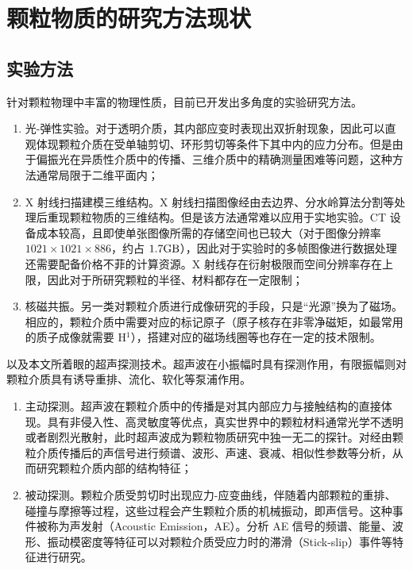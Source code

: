 \section{颗粒物质的研究方法现状}


\subsection{实验方法}

针对颗粒物理中丰富的物理性质，目前已开发出多角度的实验研究方法。

\begin{enumerate}
  \item 光-弹性实验\cite{photoelasticimetry}。对于透明介质，其内部应变时表现出双折射现象，因此可以直观体现颗粒介质在受单轴剪切、环形剪切等条件下其中内的应力分布。但是由于偏振光在异质性介质中的传播、三维介质中的精确测量困难等问题\cite{Non-Destructive_3D_Photoelasticity}，这种方法通常局限于二维平面内；
  \item X 射线扫描建模三维结构\cite{PhysRevE.68.020301}。X 射线扫描图像经由去边界、分水岭算法分割等处理后重现颗粒物质的三维结构。但是该方法通常难以应用于实地实验。CT 设备成本较高，且即使单张图像所需的存储空间也已较大（对于图像分辨率 $1021\times 1021 \times 886$，约占 $1.7\unit{\giga\byte}$），因此对于实验时的多帧图像进行数据处理还需要配备价格不菲的计算资源。X 射线存在衍射极限而空间分辨率存在上限，因此对于所研究颗粒的半径、材料都存在一定限制；
  \item 核磁共振\cite{CLARKE2023}。另一类对颗粒介质进行成像研究的手段，只是“光源”换为了磁场。相应的，颗粒介质中需要对应的标记原子（原子核存在非零净磁矩，如最常用的质子成像就需要 H$^{1}$），搭建对应的磁场线圈等也存在一定的技术限制。
\end{enumerate}

以及本文所着眼的超声探测技术。超声波在小振幅时具有探测作用，有限振幅则对颗粒介质具有诱导重排、流化、软化等泵浦作用。%

\begin{enumerate}
  \item 主动探测。超声波在颗粒介质中的传播是对其内部应力与接触结构的直接体现\cite{PhysRevB.48.15646,Jia1999UltrasoundPI,Transitional}。具有非侵入性、高灵敏度等优点，真实世界中的颗粒材料通常光学不透明或者剧烈光散射，此时超声波成为颗粒物质研究中独一无二的探针。对经由颗粒介质传播后的声信号进行频谱、波形、声速、衰减、相似性参数等分析，从而研究颗粒介质内部的结构特征；
  \item 被动探测。颗粒介质受剪切时出现应力-应变曲线，伴随着内部颗粒的重排、碰撞与摩擦等过程，这些过程会产生颗粒介质的机械振动，即声信号。这种事件被称为声发射（Acoustic Emission，AE）。分析 AE 信号的频谱、能量、波形、振动模密度等特征\cite{PhysRevLett.120.218003,10.1029/2023JB026612,doi:10.1073/pnas.2305134120,}可以对颗粒介质受应力时的滞滑（Stick-slip）事件等特征进行研究。
\end{enumerate}


